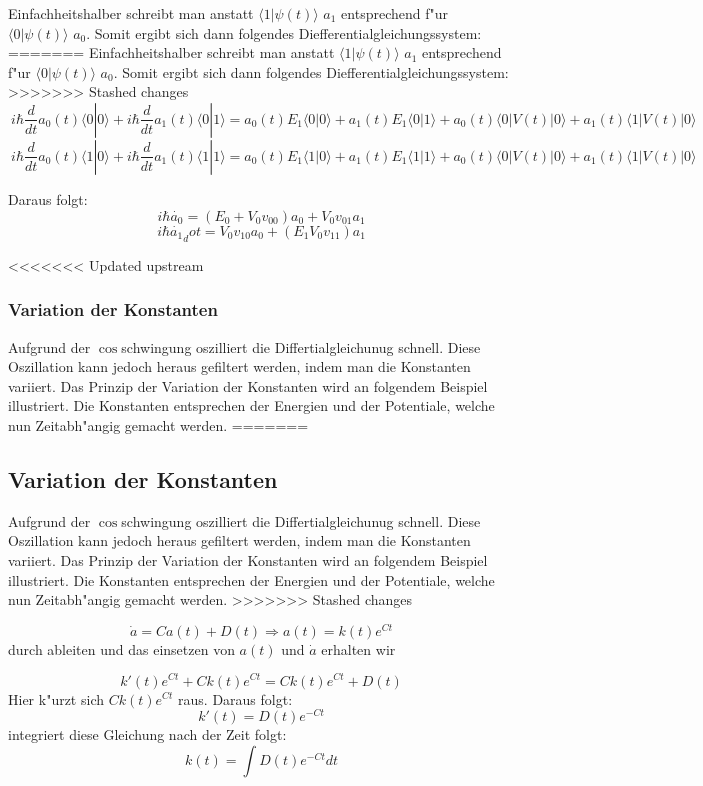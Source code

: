 \begin{refsection}
Einfachheitshalber schreibt man anstatt $\langle1|\psi(t)\rangle$ $a_1$
entsprechend f"ur $\langle0|\psi(t)\rangle$ $a_0$. Somit ergibt sich
dann folgendes Diefferentialgleichungssystem:
=======
Einfachheitshalber schreibt man anstatt $\langle1|\psi(t)\rangle$ $a_1$ entsprechend f"ur $\langle0|\psi(t)\rangle$ $a_0$. Somit ergibt sich dann folgendes Diefferentialgleichungssystem:
>>>>>>> Stashed changes
\[
\ i\hbar\frac{d}{dt}a_{0}(t)\langle0|0\rangle +i\hbar\frac{d}{dt}a_{1}(t)\langle0|1\rangle = a_{0}(t)E_{1}\langle0|0\rangle + a_{1}(t)E_{1}\langle0|1\rangle + a_{0}(t)\langle0|V(t)|0\rangle+ a_{1}(t)\langle1|V(t)|0\rangle
\]
\[
\ i\hbar\frac{d}{dt}a_{0}(t)\langle1|0\rangle +i\hbar\frac{d}{dt}a_{1}(t)\langle1|1\rangle = a_{0}(t)E_{1}\langle1|0\rangle + a_{1}(t)E_{1}\langle1|1\rangle + a_{0}(t)\langle0|V(t)|0\rangle+ a_{1}(t)\langle1|V(t)|0\rangle
\]

Daraus folgt:
\[
\ i\hbar\dot{a_{0}} = (E_{0} + V_{0} v_{00}) a_{0} + V_{0} v_{01} a_{1}
\]
\[
\ i\hbar\dot{a_{1}}_dot = V_{0} v_{10} a_{0} + (E_{1} V_{0} v_{11}) a_{1}
\]

<<<<<<< Updated upstream
\subsubsection{Variation der Konstanten}
Aufgrund der $\cos$schwingung oszilliert die Differtialgleichunug
schnell. Diese Oszillation kann jedoch heraus gefiltert werden, indem
man die Konstanten variiert. Das Prinzip der Variation der Konstanten
wird an folgendem Beispiel illustriert. Die Konstanten entsprechen der
Energien und der Potentiale, welche nun Zeitabh"angig gemacht werden.
=======
\subsection{Variation der Konstanten}
Aufgrund der $\cos$schwingung oszilliert die Differtialgleichunug schnell. Diese Oszillation kann jedoch heraus gefiltert werden, indem man die Konstanten variiert. Das Prinzip der Variation der Konstanten wird an folgendem Beispiel illustriert. Die Konstanten entsprechen der Energien und der Potentiale, welche nun Zeitabh"angig gemacht werden.
>>>>>>> Stashed changes

\[
\ \dot{a} = C a(t) + D(t) \Rightarrow a(t) = k(t) e^{C t}
\] 
durch ableiten und das einsetzen von $ a(t)$ und  $ \dot{a} $ erhalten wir

\[
\ k'(t) e^{C t} + C k(t) e^{C t} = C k(t) e^{C t} + D(t)
\] 
Hier k"urzt sich $ C k(t) e^{C t} $ raus.
Daraus folgt:
\[
\ k'(t) = D(t) e^{-C t}
\] 
integriert diese Gleichung nach der Zeit folgt:
\[
\ k(t) = \int D(t) e^{-C t} dt 
\]
 

\end{refsection}
